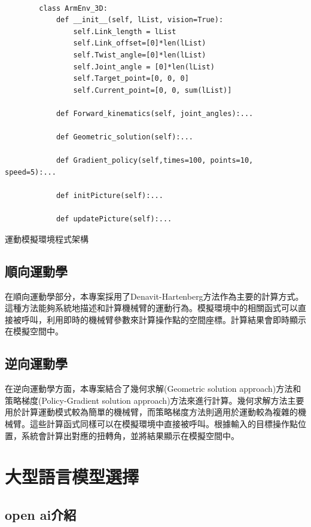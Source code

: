 \documentclass[class=NCU_thesis, crop=false]{standalone}
\begin{document}
\begin{listing}
    \begin{verbatim}

        class ArmEnv_3D:
            def __init__(self, lList, vision=True):
                self.Link_length = lList
                self.Link_offset=[0]*len(lList)
                self.Twist_angle=[0]*len(lList)
                self.Joint_angle = [0]*len(lList)
                self.Target_point=[0, 0, 0]
                self.Current_point=[0, 0, sum(lList)]

            def Forward_kinematics(self, joint_angles):...
            
            def Geometric_solution(self):...

            def Gradient_policy(self,times=100, points=10, speed=5):...

            def initPicture(self):...

            def updatePicture(self):...

    \end{verbatim}
\caption{運動模擬環境程式架構} 
\end{listing}

\subsection{順向運動學}
在順向運動學部分，本專案採用了Denavit-Hartenberg方法作為主要的計算方式。這種方法能夠系統地描述和計算機械臂的運動行為。模擬環境中的相關函式可以直接被呼叫，利用即時的機械臂參數來計算操作點的空間座標。計算結果會即時顯示在模擬空間中。

\subsection{逆向運動學}
在逆向運動學方面，本專案結合了幾何求解(Geometric solution approach)方法和策略梯度(Policy-Gradient solution approach)方法來進行計算。幾何求解方法主要用於計算運動模式較為簡單的機械臂，而策略梯度方法則適用於運動較為複雜的機械臂。這些計算函式同樣可以在模擬環境中直接被呼叫。根據輸入的目標操作點位置，系統會計算出對應的扭轉角，並將結果顯示在模擬空間中。

\section{大型語言模型選擇}
\subsection{open ai介紹}
\end{document}
